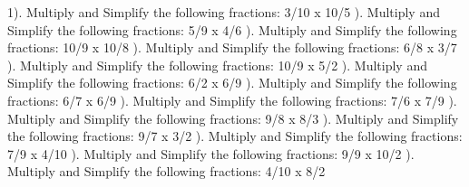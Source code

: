 \documentclass{article}%
\begin{document}
1). Multiply and Simplify the following fractions: 3/10 x 10/5%
\newline%
\newline%
). Multiply and Simplify the following fractions: 5/9 x 4/6%
\newline%
\newline%
). Multiply and Simplify the following fractions: 10/9 x 10/8%
\newline%
\newline%
). Multiply and Simplify the following fractions: 6/8 x 3/7%
\newline%
\newline%
). Multiply and Simplify the following fractions: 10/9 x 5/2%
\newline%
\newline%
). Multiply and Simplify the following fractions: 6/2 x 6/9%
\newline%
\newline%
). Multiply and Simplify the following fractions: 6/7 x 6/9%
\newline%
\newline%
). Multiply and Simplify the following fractions: 7/6 x 7/9%
\newline%
\newline%
). Multiply and Simplify the following fractions: 9/8 x 8/3%
\newline%
\newline%
). Multiply and Simplify the following fractions: 9/7 x 3/2%
\newline%
\newline%
). Multiply and Simplify the following fractions: 7/9 x 4/10%
\newline%
\newline%
). Multiply and Simplify the following fractions: 9/9 x 10/2%
\newline%
\newline%
). Multiply and Simplify the following fractions: 4/10 x 8/2%
\end{document}
